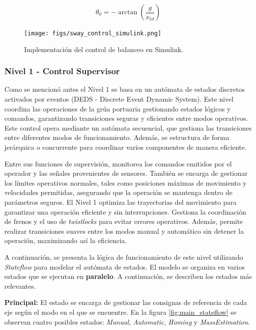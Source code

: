 \documentclass{article}
\begin{document}
        \begin{equation}
            \theta_0 = -\arctan\left(\frac{g}{\ddot{x}_{td}}\right)
            \label{eq:theta0}
        \end{equation}

        \begin{figure} [H]
            \centering
            \texttt{[image: figs/sway\_control\_simulink.png]}
            \caption{Implementación del control de balanceo en Simulink.}
            \label{fig:sway_control_simulink}
        \end{figure}



        \subsubsection{Nivel 1 - Control Supervisor}

        Como se mencionó antes el Nivel 1 se basa en un autómata de estados discretos activados por eventos (DEDS - Discrete Event Dynamic System). Este nivel coordina las operaciones de la grúa portuaria gestionando estados lógicos y comandos, garantizando transiciones seguras y eficientes entre modos operativos. Este control opera mediante un autómata secuencial, que gestiona las transiciones entre diferentes modos de funcionamiento. Además, se estructura de forma jerárquica o concurrente para coordinar varios componentes de manera eficiente.

        Entre sus funciones de supervisión, monitorea los comandos emitidos por el operador y las señales provenientes de sensores. También se encarga de gestionar los límites operativos normales, tales como posiciones máximas de movimiento y velocidades permitidas, asegurando que la operación se mantenga dentro de parámetros seguros.
        El Nivel 1 optimiza las trayectorias del movimiento para garantizar una operación eficiente y sin interrupciones. Gestiona la coordinación de frenos y el uso de \textit{twistlocks} para evitar errores operativos. Además, permite realizar transiciones suaves entre los modos manual y automático sin detener la operación, maximizando así la eficiencia.

        A continuación, se presenta la lógica de funcionamiento de este nivel utilizando \textit{Stateflow} para modelar el autómata de estados. El modelo se organiza en varios estados que se ejecutan en \textbf{paralelo}. A continuación, se describen los estados más relevantes.


        \textbf{Principal:} 
            El estado se encarga de gestionar las consignas de referencia de cada eje según el modo en el que se encuentre. En la figura \ref{fig:main_stateflow} se observan cuatro posibles estados: \textit{Manual}, \textit{Automatic}, \textit{Homing} y \textit{MassEstimation}. 
\end{document}
